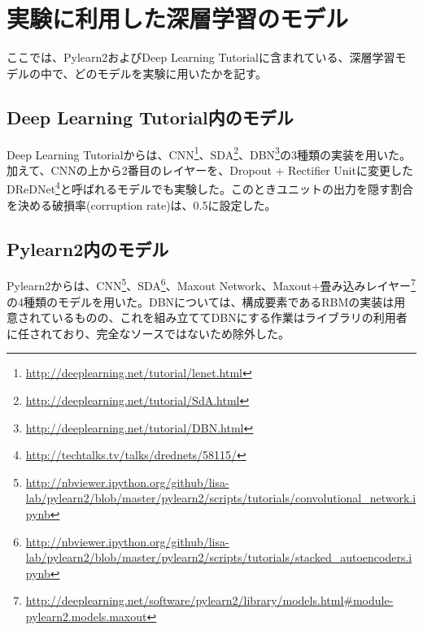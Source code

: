 \section{実験に利用した深層学習のモデル}
ここでは、Pylearn2およびDeep Learning Tutorialに含まれている、深層学習モデルの中で、どのモデルを実験に用いたかを記す。

\subsection{Deep Learning Tutorial内のモデル}
Deep Learning Tutorialからは、CNN\footnote{\url{http://deeplearning.net/tutorial/lenet.html}}、SDA\footnote{\url{http://deeplearning.net/tutorial/SdA.html}}、DBN\footnote{\url{http://deeplearning.net/tutorial/DBN.html}}の3種類の実装を用いた。加えて、CNNの上から2番目のレイヤーを、Dropout + Rectifier Unitに変更したDReDNet\footnote{\url{http://techtalks.tv/talks/drednets/58115/}}と呼ばれるモデルでも実験した。このときユニットの出力を隠す割合を決める破損率(corruption rate)は、0.5に設定した。

\subsection{Pylearn2内のモデル}
Pylearn2からは、CNN\footnote{\url{http://nbviewer.ipython.org/github/lisa-lab/pylearn2/blob/master/pylearn2/scripts/tutorials/convolutional_network.ipynb}}、SDA\footnote{\url{http://nbviewer.ipython.org/github/lisa-lab/pylearn2/blob/master/pylearn2/scripts/tutorials/stacked_autoencoders.ipynb}}、Maxout Network、Maxout+畳み込みレイヤー\footnote{\url{http://deeplearning.net/software/pylearn2/library/models.html\#module-pylearn2.models.maxout}}の4種類のモデルを用いた。DBNについては、構成要素であるRBMの実装は用意されているものの、これを組み立ててDBNにする作業はライブラリの利用者に任されており、完全なソースではないため除外した。

